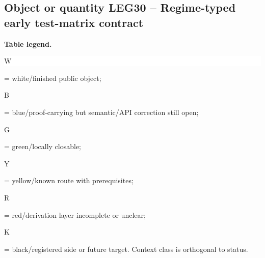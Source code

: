 \subsection*{Object or quantity LEG30 -- Regime-typed early test-matrix contract}
\hypertarget{objproof:LEG30}{}
\par\smallskip\noindent\begin{minipage}{0.99\linewidth}\footnotesize\raggedright\textbf{Table legend.} \colorbox{white}{\strut W} = white/finished public object; \colorbox{cyan!20}{\strut B} = blue/proof-carrying but semantic/API correction still open; \colorbox{green!18}{\strut G} = green/locally closable; \colorbox{yellow!25}{\strut Y} = yellow/known route with prerequisites; \colorbox{red!20}{\strut R} = red/derivation layer incomplete or unclear; \colorbox{black!18}{\strut K} = black/registered side or future target. Context class is orthogonal to status.\end{minipage}\par\vspace{0.25em}
